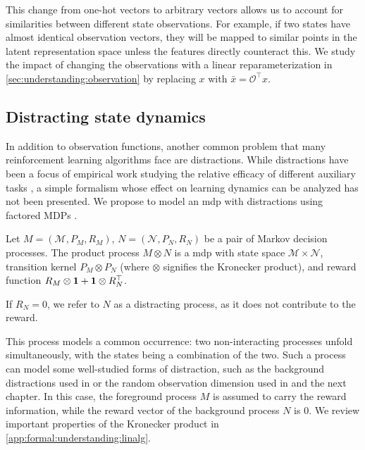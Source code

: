 This change from one-hot vectors to arbitrary vectors allows us to account for similarities between different state observations.
For example, if two states have almost identical observation vectors, they will be mapped to similar points in the latent representation space unless the features directly counteract this.
We study the impact of changing the observations with a linear reparameterization in \autoref{sec:understanding:observation} by replacing $x$ with $\bar{x} = \mathcal{O}^\top x$.

\subsection{Distracting state dynamics}
In addition to observation functions, another common problem that many reinforcement learning algorithms face are distractions.
While distractions have been a focus of empirical work studying the relative efficacy of different auxiliary tasks \parencite{ni2024bridging}, a simple formalism whose effect on learning dynamics can be analyzed has not been presented. 
We propose to model an \ac{mdp}  with distractions using factored MDPs \parencite{boutilier2000stochastic}.

\begin{definition}\label{def:distracting}
Let $M=(\mathcal{M}, P_{M},R_M)$,  $N=(\mathcal{N},P_N,R_N)$ be a pair of Markov decision processes.
The product process $M \otimes N$ is a \ac{mdp}  with state space $\mathcal{M}\times \mathcal{N}$, transition kernel $P_M\otimes P_N$ (where $\otimes$ signifies the Kronecker product), and reward function $R_M\otimes {\bm{1}} +{\bm{1}} \otimes R_N^\top$.

If $R_N = 0$, we refer to $N$ as a distracting process, as it does not contribute to the reward.
\end{definition}

This process models a common occurrence: two non-interacting processes unfold simultaneously, with the states being a combination of the two.
Such a process can model some well-studied forms of distraction, such as the background distractions used in \textcite{stone2021thedc} or the random observation dimension used in \textcite{nikishin2021control} and the next chapter.
In this case, the foreground process $M$ is assumed to carry the reward information, while the reward vector of the background process $N$ is 0.
We review important properties of the Kronecker product in \autoref{app:formal:understanding:linalg}.


